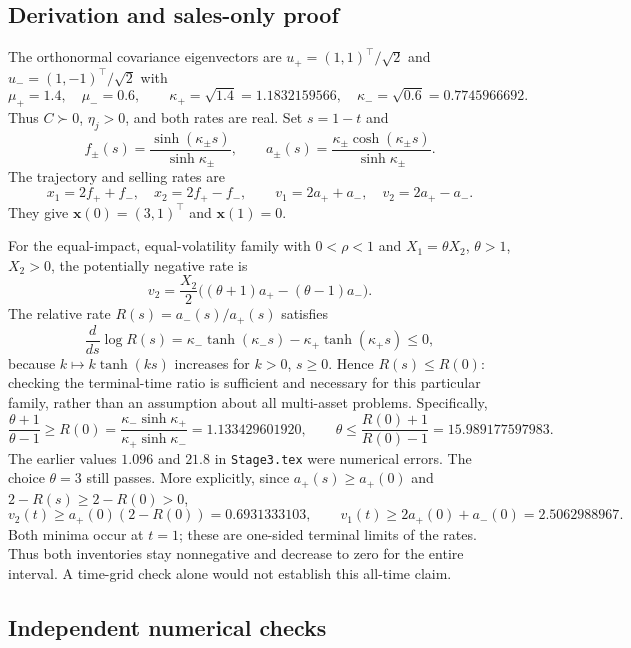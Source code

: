 \documentclass[11pt,a4paper]{article}
\begin{document}
\subsection*{Derivation and sales-only proof}

The orthonormal covariance eigenvectors are
$u_+=(1,1)^\top/\sqrt2$ and $u_-=(1,-1)^\top/\sqrt2$ with
\[
 \mu_+=1.4,\quad\mu_-=0.6,\qquad
 \kappa_+=\sqrt{1.4}=1.1832159566,\quad
 \kappa_-=\sqrt{0.6}=0.7745966692.
\]
Thus $C\succ0$, $\eta_j>0$, and both rates are real. Set $s=1-t$ and
\[
 f_\pm(s)=\frac{\sinh(\kappa_\pm s)}{\sinh\kappa_\pm},\qquad
 a_\pm(s)=\frac{\kappa_\pm\cosh(\kappa_\pm s)}{\sinh\kappa_\pm}.
\]
The trajectory and selling rates are
\begin{equation}
 x_1=2f_++f_-,\quad x_2=2f_+-f_-,\qquad
 v_1=2a_++a_-,\quad v_2=2a_+-a_-.
 \label{eq:stage3-rates}
\end{equation}
They give $\mathbf x(0)=(3,1)^\top$ and $\mathbf x(1)=0$.

For the equal-impact, equal-volatility family with $0<\rho<1$ and
$X_1=\theta X_2$, $\theta>1$, $X_2>0$, the potentially negative rate is
\[
 v_2=\frac{X_2}{2}\big((\theta+1)a_+-(\theta-1)a_-\big).
\]
The relative rate $R(s)=a_-(s)/a_+(s)$ satisfies
\[
 \frac{d}{ds}\log R(s)
 =\kappa_-\tanh(\kappa_-s)-\kappa_+\tanh(\kappa_+s)\le0,
\]
because $k\mapsto k\tanh(ks)$ increases for $k>0$, $s\ge0$.
Hence $R(s)\le R(0)$: checking the terminal-time ratio is sufficient and
necessary for this particular family, rather than an assumption about all
multi-asset problems. Specifically,
\begin{equation}
 \frac{\theta+1}{\theta-1}\ge
 R(0)=\frac{\kappa_-\sinh\kappa_+}{\kappa_+\sinh\kappa_-}
 =1.133429601920,
 \qquad
 \theta\le\frac{R(0)+1}{R(0)-1}=15.989177597983.
 \label{eq:stage3-bound}
\end{equation}
The earlier values $1.096$ and $21.8$ in \texttt{Stage3.tex} were numerical
errors. The choice $\theta=3$ still passes. More explicitly, since
$a_+(s)\ge a_+(0)$ and $2-R(s)\ge2-R(0)>0$,
\[
 v_2(t)\ge a_+(0)(2-R(0))=0.6931333103,
 \qquad v_1(t)\ge2a_+(0)+a_-(0)=2.5062988967.
\]
Both minima occur at $t=1$; these are one-sided terminal limits of the rates.
Thus both inventories stay nonnegative and decrease to zero for the entire
interval. A time-grid check alone would not establish this all-time claim.

\subsection*{Independent numerical checks}
\end{document}
